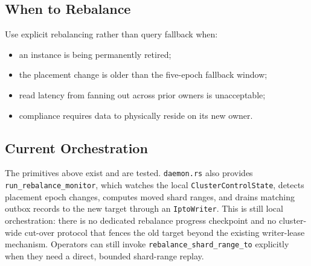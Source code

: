 \subsection{When to Rebalance}

Use explicit rebalancing rather than query fallback when:

\begin{itemize}
\item an \ipto{} instance is being permanently retired;
\item the placement change is older than the five-epoch fallback window;
\item read latency from fanning out across prior owners is unacceptable;
\item compliance requires data to physically reside on its new owner.
\end{itemize}

\subsection{Current Orchestration}

The primitives above exist and are tested. \texttt{daemon.rs} also provides
\texttt{run\_rebalance\_monitor}, which watches the local
\texttt{ClusterControlState}, detects placement epoch changes, computes moved
shard ranges, and drains matching outbox records to the new target through an
\texttt{IptoWriter}. This is still local orchestration: there is no dedicated
rebalance progress checkpoint and no cluster-wide cut-over protocol that fences
the old target beyond the existing writer-lease mechanism. Operators can still
invoke \texttt{rebalance\_shard\_range\_to} explicitly when they need a direct,
bounded shard-range replay.

\endinput
